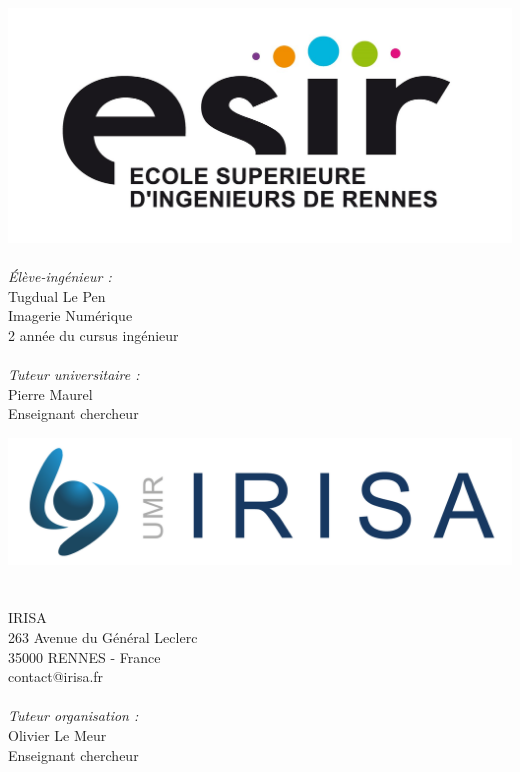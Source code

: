 \begin{titlepage}
  \begin{center}

    \begin{minipage}{0.45\textwidth}
      \begin{flushleft} \large
        \includegraphics[width=0.9\columnwidth]{datas/logo_esir.jpg}~\\
        \emph{Élève-ingénieur :}\\
        Tugdual Le Pen\\
        Imagerie Numérique\\
        2 année du cursus ingénieur\\
        ~\\
        \emph{Tuteur universitaire :}\\
        Pierre Maurel\\
        Enseignant chercheur
      \end{flushleft}
    \end{minipage}
    \begin{minipage}{0.45\textwidth}
      \begin{flushright} \large
        \vspace{19pt}
        \includegraphics[width=0.9\columnwidth]{datas/logo_irisa.jpg}~\\~\\
        IRISA\\
        263 Avenue du Général Leclerc\\
        35000 RENNES - France\\
        contact@irisa.fr\\
        ~\\        
        \emph{Tuteur organisation :}\\
        Olivier Le Meur\\
        Enseignant chercheur\\
      \end{flushright}
    \end{minipage}


\end{center}
\end{titlepage}
